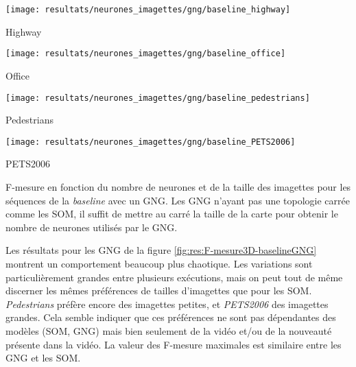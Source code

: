 	\begin{figureth}
		\begin{subfigureth}{.45\textwidth}
			\texttt{[image: resultats/neurones\_imagettes/gng/baseline\_highway]}\caption{Highway}
		\end{subfigureth}
		\begin{subfigureth}{.45\textwidth}
			\texttt{[image: resultats/neurones\_imagettes/gng/baseline\_office]}\caption{Office}
		\end{subfigureth}
		\begin{subfigureth}{.45\textwidth}
			\texttt{[image: resultats/neurones\_imagettes/gng/baseline\_pedestrians]}\caption{Pedestrians}
		\end{subfigureth}
		\begin{subfigureth}{.45\textwidth}
			\texttt{[image: resultats/neurones\_imagettes/gng/baseline\_PETS2006]}\caption{PETS2006}
		\end{subfigureth}
		\caption[Nombre de neurones et de taille des imagettes, GNG/baseline]{F-mesure en fonction du nombre de neurones et de la taille des imagettes pour les séquences de la \textit{baseline} avec un GNG. Les GNG n'ayant pas une topologie carrée comme les SOM, il suffit de mettre au carré la taille de la carte pour obtenir le nombre de neurones utilisés par le GNG.}\label{fig:res:F-mesure3D-baselineGNG}
	\end{figureth}

	Les résultats pour les GNG de la figure \ref{fig:res:F-mesure3D-baselineGNG} montrent un comportement beaucoup plus chaotique. Les variations sont particulièrement grandes entre plusieurs exécutions, mais on peut tout de même discerner les mêmes préférences de tailles d'imagettes que pour les SOM. \textit{Pedestrians} préfère encore des imagettes petites, et \textit{PETS2006} des imagettes grandes. Cela semble indiquer que ces préférences ne sont pas dépendantes des modèles (SOM, GNG) mais bien seulement de la vidéo et/ou de la nouveauté présente dans la vidéo. La valeur des F-mesure maximales est similaire entre les GNG et les SOM. 

